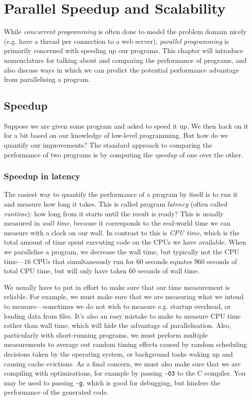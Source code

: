 \chapter{Parallel Speedup and Scalability}
\label{chap:scaling}

While \emph{concurrent programming} is often done to model the problem
domain nicely (e.g. have a thread per connection to a web server),
\emph{parallel programming} is primarily concerned with speeding up
our programs.  This chapter will introduce nomenclature for talking
about and comparing the performance of programs, and also discuss ways
in which we can predict the potential performance advantage from
parallelising a program.

\section{Speedup}
\label{sec:speedup}

Suppose we are given some program and asked to speed it up.  We then
hack on it for a bit based on our knowledge of low-level programming.
But how do we quantify our improvements?  The standard approach to
comparing the performance of two programs is by computing the
\emph{speedup} of one over the other.

\subsection{Speedup in latency}
\label{sec:speedup-in-latency}

The easiest way to quantify the performance of a program by itself is
to run it and measure how long it takes.  This is called program
\emph{latency} (often called \emph{runtime}): how long from it starts
until the result is ready?  This is usually measured in \emph{wall
  time}, because it corresponds to the real-world time we can measure
with a clock on our wall.  In contrast to this is \emph{CPU time},
which is the total amount of time spent executing code on the CPUs we
have available.  When we parallelise a program, we decrease the wall
time, but typically not the CPU time---$16$ CPUs that simultaneously
run for $60$ seconds equates $960$ seconds of total CPU time, but will
only have taken $60$ seconds of wall time.

We usually have to put in effort to make sure that our time
measurement is reliable.  For example, we must make sure that we are
measuring what we intend to measure---sometimes we do not wish to
measure e.g. startup overhead, or loading data from files.  It's also
an easy mistake to make to measure CPU time rather than wall time,
which will hide the advantage of parallelisation.  Also, particularly
with short-running programs, we must perform multiple measurements to
average out random timing effects caused by random scheduling
decisions taken by the operating system, or background tasks waking up
and causing cache evictions.  As a final concern, we must also make
sure that we are compiling with optimisations, for example by passing
\texttt{-O3} to the C compiler.  You may be used to passing
\texttt{-g}, which is good for debugging, but hinders the performance
of the generated code.

